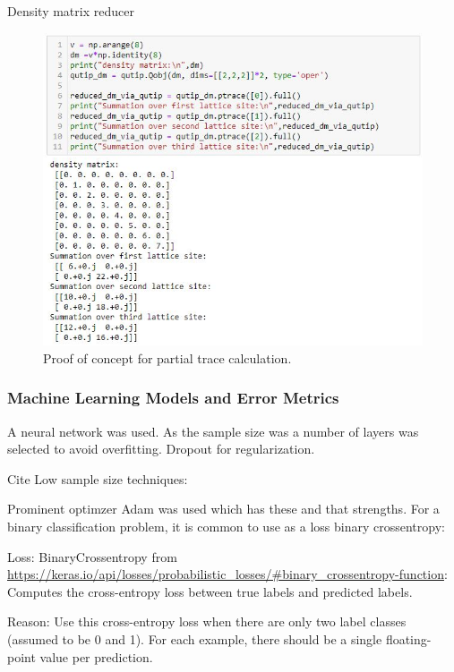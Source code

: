 \documentclass[reprint,amsmath,amssymb,aps,prb]{revtex4-2}
\begin{document}
Density matrix reducer

\begin{figure}[h!]
\centering
\includegraphics[width=\linewidth]{figures/partialtrace_proof_of_concept}
\caption{Proof of concept for partial trace calculation.}
\label{fig:partialtrace_proof_of_concept}
\end{figure}


\subsubsection{Machine Learning Models and Error Metrics}

A neural network was used. As the sample size was %
a number of layers was selected to avoid overfitting.
Dropout for regularization.

Cite Low sample size techniques:

Prominent optimzer Adam was used which has these and that strengths.
For a binary classification problem, it is common to use as a loss binary crossentropy:


Loss: BinaryCrossentropy from \url{https://keras.io/api/losses/probabilistic_losses/#binary_crossentropy-function}:
Computes the cross-entropy loss between true labels and predicted labels.

Reason:
Use this cross-entropy loss when there are only two label classes (assumed to be 0 and 1). For each example, there should be a single floating-point value per prediction.
\end{document}
